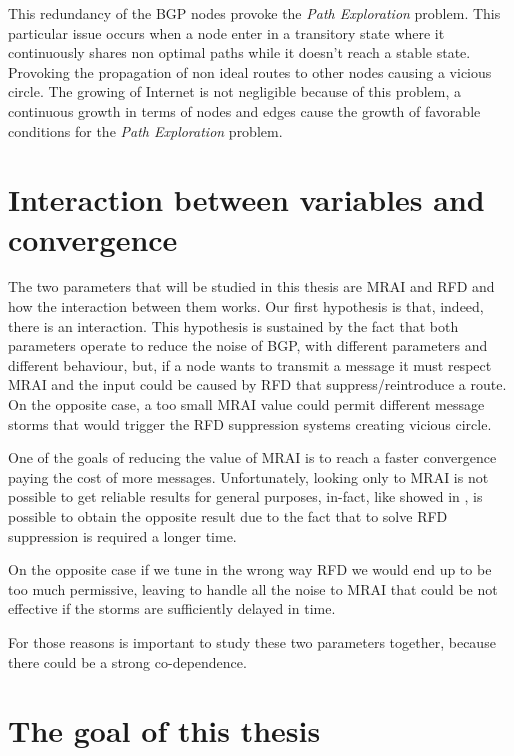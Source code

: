 This redundancy of the \ac{BGP} nodes provoke the \textit{Path Exploration}
problem.
This particular issue occurs when a node enter in a transitory state where it
continuously shares non optimal paths while it doesn't reach a stable state.
Provoking the propagation of non ideal routes to other nodes causing a vicious
circle.
The growing of Internet is not negligible because of this problem, a continuous
growth in terms of nodes and edges cause the growth of favorable conditions for
the \textit{Path Exploration} problem.

\section{Interaction between variables and convergence}
\label{sec:bgp_correlations}

The two parameters that will be studied in this thesis are \ac{MRAI} and \ac{RFD}
and how the interaction between them works.
Our first hypothesis is that, indeed, there is an interaction.
This hypothesis is sustained by the fact that both parameters operate to
reduce the noise of \ac{BGP}, with different parameters and different behaviour,
but, if a node wants to transmit a message it must respect \ac{MRAI} and the input
could be caused by \ac{RFD} that suppress/reintroduce a route.
On the opposite case, a too small \ac{MRAI} value could permit different message
storms that would trigger the \ac{RFD} suppression systems creating vicious circle.

One of the goals of reducing the value of \ac{MRAI} is to reach a faster convergence
paying the cost of more messages.
Unfortunately, looking only to \ac{MRAI} is not possible to get reliable results
for general purposes, in-fact, like showed in , is possible
to obtain the opposite result due to the fact that to solve \ac{RFD} suppression
is required a longer time.

On the opposite case if we tune in the wrong way \ac{RFD} we would end up to
be too much permissive, leaving to handle all the noise to \ac{MRAI} that could
be not effective if the storms are sufficiently delayed in time.

For those reasons is important to study these two parameters together, because
there could be a strong co-dependence.

\section{The goal of this thesis}
\label{sec:thesis_goal}

